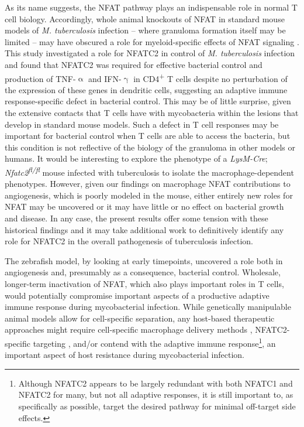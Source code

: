 As its name suggests, the NFAT pathway plays an indispensable role in normal T cell biology. Accordingly, whole animal knockouts of NFAT in standard mouse models of \textit{M. tuberculosis} infection -- where granuloma formation itself may be limited -- may have obscured a role for myeloid\hyp{}specific effects of NFAT signaling \citep{Via2012}. This study investigated a role for NFATC2 in control of \textit{M. tuberculosis} infection and found that NFATC2 was required for effective bacterial control and production of TNF\hyp{}$\upalpha$ and IFN\hyp{}$\upgamma$ in CD4\textsuperscript{+} T cells despite no perturbation of the expression of these genes in dendritic cells, suggesting an adaptive immune response\hyp{}specific defect in bacterial control. This may be of little surprise, given the extensive contacts that T cells have with mycobacteria within the lesions that develop in standard mouse models. Such a defect in T cell responses may be important for bacterial control when T cells are able to access the bacteria, but this condition is not reflective of the biology of the granuloma in other models or humans. It would be interesting to explore the phenotype of a \textit{LysM\hyp{}Cre}; \textit{Nfatc2\textsuperscript{fl/fl}} mouse infected with tuberculosis to isolate the macrophage\hyp{}dependent phenotypes. However, given our findings on macrophage NFAT contributions to angiogenesis, which is poorly modeled in the mouse, either entirely new roles for NFAT may be uncovered or it may have little or no effect on bacterial growth and disease. In any case, the present results offer some tension with these historical findings and it may take additional work to definitively identify any role for NFATC2 in the overall pathogenesis of tuberculosis infection.

The zebrafish model, by looking at early timepoints, uncovered a role both in angiogenesis and, presumably as a consequence, bacterial control. Wholesale, longer\hyp{}term inactivation of NFAT, which also plays important roles in T cells, would potentially compromise important aspects of a productive adaptive immune response during mycobacterial infection. While genetically manipulable animal models allow for cell\hyp{}specific separation, any host\hyp{}based therapeutic approaches might require cell\hyp{}specific macrophage delivery methods \citep{Hu2019, Mukhtar2020, Colombo2022}, NFATC2\hyp{}specific targeting \citep{Kitamura2021}, and/or contend with the adaptive immune response\footnote{Although NFATC2 appears to be largely redundant with both NFATC1 and NFATC2 for many, but not all adaptive responses, it is still important to, as specifically as possible, target the desired pathway for minimal off\hyp{}target side effects.}, an important aspect of host resistance during mycobacterial infection.

